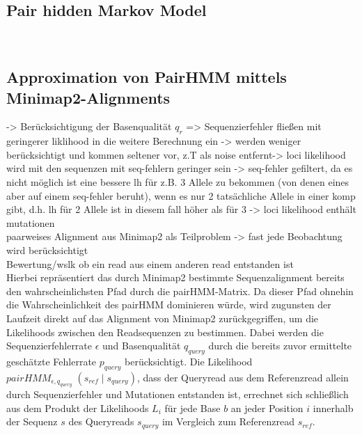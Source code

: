 \subsection{Pair hidden Markov Model} \label{subsec:sol_phmm}

~\cite{yoon_2009}
~\cite{knudsen_2003}
~\cite{}
~\cite{}
~\cite{}
~\cite{}

\subsection{Approximation von PairHMM mittels Minimap2-Alignments} \label{subsec:phmm_minimap}

-> Berücksichtigung der Basenqualität $q_{r}$ => Sequenzierfehler fließen mit geringerer liklihood in die weitere Berechnung ein -> werden weniger berücksichtigt und kommen seltener vor, z.T als noise entfernt-> loci likelihood wird mit den sequenzen mit seq-fehlern geringer sein -> seq-fehler gefiltert, da es nicht möglich ist eine  bessere lh für z.B. 3 Allele zu bekommen (von denen eines aber auf einem seq-fehler beruht), wenn es nur 2 tatsächliche Allele in einer komp gibt, d.h. lh für 2 Allele ist in diesem fall höher als für 3 -> loci likelihood enthält mutationen \\
paarweises Alignment aus Minimap2 als Teilproblem -> fast jede Beobachtung wird berücksichtigt\\
Bewertung/wslk ob ein read aus einem anderen read entstanden ist\\

 Hierbei repräsentiert das durch Minimap2 bestimmte Sequenzalignment bereits den wahrscheinlichsten Pfad durch die pairHMM-Matrix. Da dieser Pfad ohnehin die Wahrscheinlichkeit des pairHMM dominieren würde, wird zugunsten der Laufzeit direkt auf das Alignment von Minimap2 zurückgegriffen, um die Likelihoods zwischen den Readsequenzen zu bestimmen. Dabei werden die Sequenzierfehlerrate $ \epsilon $ und Basenqualität $ q_{query} $ durch die bereits zuvor ermittelte geschätzte Fehlerrate $ p_{query} $ berücksichtigt. Die Likelihood $ pairHMM_{\epsilon, q_{query}} \;(s_{ref}\;|\; s_{query}) $, dass der Queryread aus dem Referenzread allein durch Sequenzierfehler und Mutationen entstanden ist, errechnet sich schließlich aus dem Produkt der Likelihoods $ L_{i} $ für jede Base $ b $ an jeder Position $ i $ innerhalb der Sequenz $ s $ des Queryreads $ s_{query} $ im Vergleich zum Referenzread $ s_{ref} $.
 
